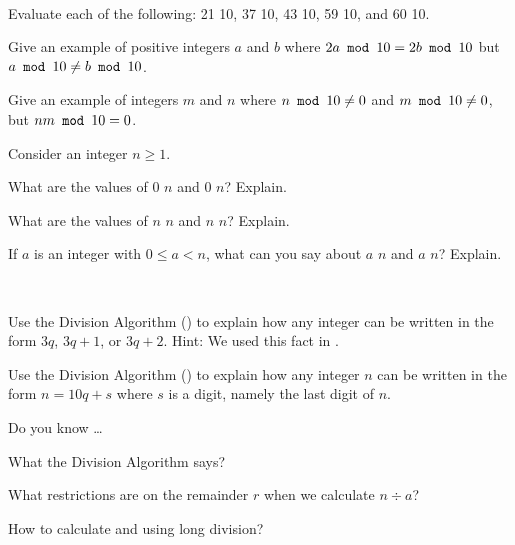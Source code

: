 \begin{exer}[\exerU] %
\label{exer_mod10_practice}
~
    \begin{exerpart}
        \item Evaluate each of the following: 21  10, 37  10, 43  10, 59  10, and 60  10.
        \item Give an example of positive integers $a$ and $b$ where $2a \texttt{ mod } 10 = 2b \texttt{ mod } 10$ but $a \texttt{ mod } 10 \neq b \texttt{ mod } 10$.
        \item Give an example of integers $m$ and $n$ where $n \texttt{ mod } 10 \neq 0$ and $m \texttt{ mod } 10 \neq 0$, but $nm \texttt{ mod } 10 = 0$.
    \end{exerpart}
\end{exer}

\begin{exer}[\exerU] %
\label{exer_modn}  
    Consider an integer $n \ge 1$.
    \begin{exerpart}
        \item What are the values of $0$  $n$ and $0$  $n$?  Explain.
        \item What are the values of $n$  $n$ and $n$  $n$?  Explain.
        \item If $a$ is an integer with $0 \le a < n$, what can you say about $a$  $n$ and $a$  $n$?  Explain.
    \end{exerpart}
\end{exer}

\begin{exer}[\exerU] %
\label{exer_cases_mod3_mod10}
~
    \begin{exerpart}
        \item \label{part_div_alg_mod3} Use the Division Algorithm () to explain how any integer can be written in the form $3q$, $3q+1$, or $3q+2$.  Hint: We used this fact in .
        \item \label{part_div_alg_mod10} Use the Division Algorithm () to explain how any integer $n$ can be written in the form $n=10q+s$ where $s$ is a digit, namely the last digit of $n$.  
    \end{exerpart}
\end{exer}

\begin{exer}[\exerR] %
\label{exer_dyk_div_alg}
    Do you know \ldots
        \begin{exerpart}
            \item What the Division Algorithm says?
            \item What restrictions are on the remainder $r$ when we calculate $n \div a$?
            \item How to calculate  and  using long division?
        \end{exerpart}
\end{exer}


